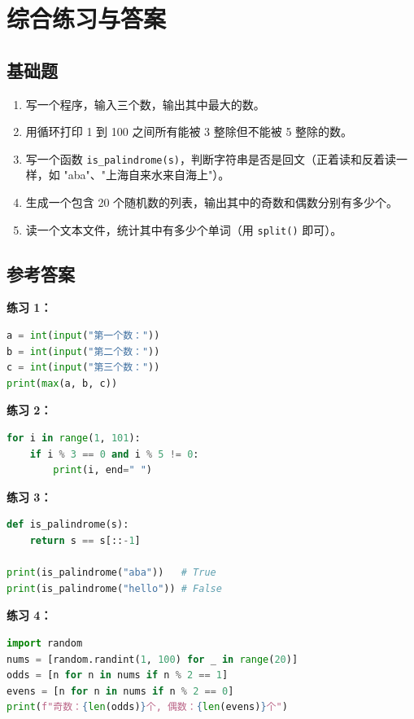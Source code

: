 \documentclass[a4paper,12pt]{ctexart}
\begin{document}
\section*{综合练习与答案}

\subsection*{基础题}

\begin{enumerate}
  \item 写一个程序，输入三个数，输出其中最大的数。
  \item 用循环打印 1 到 100 之间所有能被 3 整除但不能被 5 整除的数。
  \item 写一个函数 \texttt{is\_palindrome(s)}，判断字符串是否是回文（正着读和反着读一样，如 "aba"、"上海自来水来自海上"）。
  \item 生成一个包含 20 个随机数的列表，输出其中的奇数和偶数分别有多少个。
  \item 读一个文本文件，统计其中有多少个单词（用 \texttt{split()} 即可）。
\end{enumerate}

\subsection*{参考答案}

\textbf{练习 1：}
\begin{lstlisting}[language=Python]
a = int(input("第一个数："))
b = int(input("第二个数："))
c = int(input("第三个数："))
print(max(a, b, c))
\end{lstlisting}

\textbf{练习 2：}
\begin{lstlisting}[language=Python]
for i in range(1, 101):
    if i % 3 == 0 and i % 5 != 0:
        print(i, end=" ")
\end{lstlisting}

\textbf{练习 3：}
\begin{lstlisting}[language=Python]
def is_palindrome(s):
    return s == s[::-1]

print(is_palindrome("aba"))   # True
print(is_palindrome("hello")) # False
\end{lstlisting}

\textbf{练习 4：}
\begin{lstlisting}[language=Python]
import random
nums = [random.randint(1, 100) for _ in range(20)]
odds = [n for n in nums if n % 2 == 1]
evens = [n for n in nums if n % 2 == 0]
print(f"奇数：{len(odds)}个, 偶数：{len(evens)}个")
\end{lstlisting}
\end{document}

